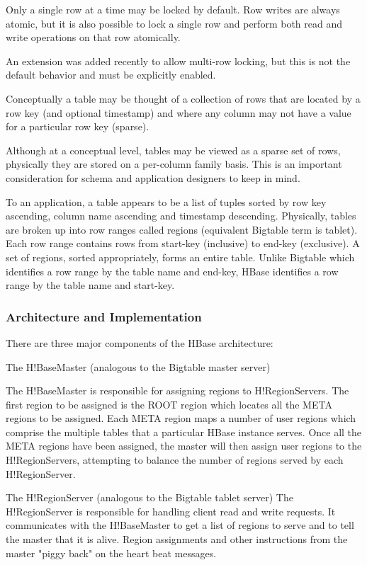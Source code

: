 \documentclass[a4paper]{article}
\begin{document}
Only a single row at a time may be locked by default. Row writes are
always atomic, but it is also possible to lock a single row and
perform both read and write operations on that row atomically. 

An extension was added recently to allow multi-row locking, but this
is not the default behavior and must be explicitly enabled. 

Conceptually a table may be thought of a collection of rows that are
located by a row key (and optional timestamp) and where any column may
not have a value for a particular row key (sparse). 

Although at a conceptual level, tables may be viewed as a sparse set
of rows, physically they are stored on a per-column family basis. This
is an important consideration for schema and application designers to
keep in mind. 

To an application, a table appears to be a list of tuples sorted by
row key ascending, column name ascending and timestamp
descending. Physically, tables are broken up into row ranges called
regions (equivalent Bigtable term is tablet). Each row range contains
rows from start-key (inclusive) to end-key (exclusive). A set of
regions, sorted appropriately, forms an entire table. Unlike Bigtable
which identifies a row range by the table name and end-key, HBase
identifies a row range by the table name and start-key. 

\subsubsection{Architecture and Implementation}
There are three major components of the HBase architecture:

The H!BaseMaster (analogous to the Bigtable master server)

The H!BaseMaster is responsible for assigning regions to
H!RegionServers. The first region to be assigned is the ROOT region
which locates all the META regions to be assigned. Each META region
maps a number of user regions which comprise the multiple tables that
a particular HBase instance serves. Once all the META regions have
been assigned, the master will then assign user regions to the
H!RegionServers, attempting to balance the number of regions served by
each H!RegionServer. 

The H!RegionServer (analogous to the Bigtable tablet server)
The H!RegionServer is responsible for handling client read and write
requests. It communicates with the H!BaseMaster to get a list of
regions to serve and to tell the master that it is alive. Region
assignments and other instructions from the master "piggy back" on the
heart beat messages. 
 
\end{document}
